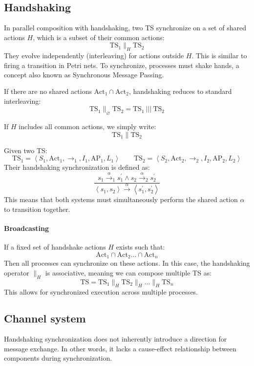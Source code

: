 \subsection{Handshaking}
In parallel composition with handshaking, two TS synchronize on a set of shared actions $H$, which is a subset of their common actions:
\[\text{TS}_1 \parallel_H \text{TS}_2\]    
They evolve independently (interleaving) for actions outside $H$.
This is similar to firing a transition in Petri nets.
To synchronize, processes must shake hands, a concept also known as Synchronous Message Passing.

If there are no shared actions $\text{Act}_1\cap \text{Act}_2$, handshaking reduces to standard interleaving:
\[\text{TS}_1\parallel_{\varnothing}\text{TS}_2=\text{TS}_1\:|||\:\text{TS}_2\]

If $H$ includes all common actions, we simply write:
\[\text{TS}_1\parallel\text{TS}_2\]

Given two TS:
\[\text{TS}_1=\left\langle S_1, \text{Act}_1, \rightarrow_1, I_1,\text{AP}_1, L_1\right\rangle \qquad \text{TS}_2=\left\langle S_2, \text{Act}_2, \rightarrow_2, I_2,\text{AP}_2, L_2\right\rangle\]    
Their handshaking synchronization is defined as: 
\[\dfrac{s_1\xrightarrow{\alpha}_1s_1^\prime\land s_2\xrightarrow{\alpha}_2s_2^\prime}{\left\langle s_1,s_2\right\rangle \xrightarrow{\alpha}\left\langle s_1^\prime,s_2^\prime\right\rangle}\]
This means that both systems must simultaneously perform the shared action $\alpha$ to transition together.

\paragraph*{Broadcasting}
If a fixed set of handshake actions $H$ exists such that: 
\[\text{Act}_1\cap \text{Act}_2 \dots \cap \text{Act}_n\]
Then all processes can synchronize on these actions.
In this case, the handshaking operator $\parallel_H$ is associative, meaning we can compose multiple TS as:
\[\text{TS}=\text{TS}_1\parallel_H\text{TS}_2\parallel_H\dots \parallel_H\text{TS}_n\]
This allows for synchronized execution across multiple processes.

\subsection{Channel system}
Handshaking synchronization does not inherently introduce a direction for message exchange. 
In other words, it lacks a cause-effect relationship between components during synchronization.

